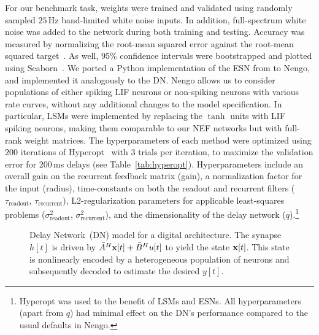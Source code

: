 For our benchmark task, weights were trained and validated using randomly sampled $25$\,Hz band-limited white noise inputs.
In addition, full-spectrum white noise was added to the network during both training and testing.
Accuracy was measured by normalizing the root-mean squared error against the root-mean squared target~\citep[NRMSE;][]{lukovsevicius2012reservoir}.
As well, $95\%$ confidence intervals were bootstrapped and plotted using Seaborn~\citep{michael_waskom_2015_19108}.
We ported a Python implementation of the ESN from \cite{lukovsevivcius2009reservoir} to Nengo, and implemented it analogously to the DN.
Nengo allows us to consider populations of either spiking LIF neurons or non-spiking neurons with various rate curves, without any additional changes to the model specification.
In particular, LSMs were implemented by replacing the $\tanh$ units with LIF spiking neurons, making them comparable to our NEF networks but with full-rank weight matrices.
The hyperparameters of each method were optimized using $200$ iterations of Hyperopt~\citep{bergstra2013making} with $3$ trials per iteration, to maximize the validation error for $200$\,ms delays (see Table~\ref{tab:hyperopt}).
Hyperparameters include an overall gain on the recurrent feedback matrix (gain), a normalization factor for the input (radius), time-constants on both the readout and recurrent filters ($\tau_\text{readout}$, $\tau_\text{recurrent}$), L2-regularization parameters for applicable least-squares problems ($\sigma^2_\text{readout}$, $\sigma^2_\text{recurrent}$), and the dimensionality of the delay network ($q$).\footnote{%
Hyperopt was used to the benefit of LSMs and ESNs. All hyperparameters (apart from $q$) had minimal effect on the DN's performance compared to the usual defaults in Nengo.}

\begin{figure}
\centering
  \caption[Model of the Delay Network for digital architectures.]{ \label{fig:delay-architecture}
    Delay Network~(DN) model for a digital architecture.
    The synapse $h[t]$ is driven by $\bar{A}^H \mathbf{x}[t] + \bar{B}^H u[t]$ to yield the state $\mathbf{x}[t]$.
    This state is nonlinearly encoded by a heterogeneous population of neurons and subsequently decoded to estimate the desired $y[t]$.
  } 
\end{figure}

